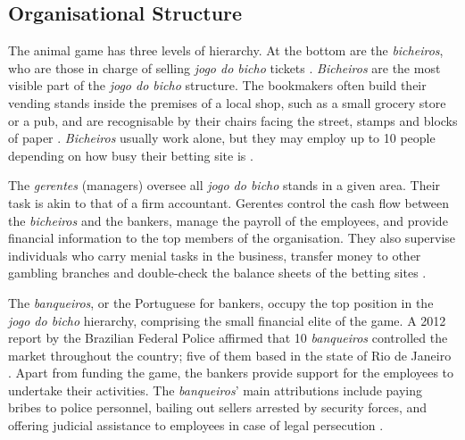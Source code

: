 \subsection{Organisational Structure}
\label{sub:organisation}

The animal game has three levels of hierarchy. At the bottom are the \emph{bicheiros}, who are those in charge of selling \emph{jogo do bicho} tickets \citep{chazkel2007beyond, chazkel2011laws, da1999aguias, labronici2014sorteio, magalhaes2005ganhou, misse2007illegal}. \emph{Bicheiros} are the most visible part of the \emph{jogo do bicho} structure. The bookmakers often build their vending stands inside the premises of a local shop, such as a small grocery store or a pub, and are recognisable by their chairs facing the street, stamps and blocks of paper \citep[259]{chazkel2011laws}. \emph{Bicheiros} usually work alone, but they may employ up to 10 people depending on how busy their betting site is \citep[69]{labronici2014sorteio}.

The \emph{gerentes} (managers) oversee all \emph{jogo do bicho} stands in a given area. Their task is akin to that of a firm accountant. Gerentes control the cash flow between the \emph{bicheiros} and the bankers, manage the payroll of the employees, and provide financial information to the top members of the organisation. They also supervise individuals who carry menial tasks in the business, transfer money to other gambling branches and double-check the balance sheets of the betting sites \citetext{\citealp[71]{labronici2012paratodos}; \citealp[142]{misse2007illegal}}.


The \emph{banqueiros}, or the Portuguese for bankers, occupy the top position in the \emph{jogo do bicho} hierarchy, comprising the small financial elite of the game. A 2012 report by the Brazilian Federal Police affirmed that 10 \emph{banqueiros} controlled the market throughout the country; five of them based in the state of Rio de Janeiro \citep{globo2012contraventores}. Apart from funding the game, the bankers provide support for the employees to undertake their activities. The \emph{banqueiros}' main attributions include paying bribes to police personnel, bailing out sellers arrested by security forces, and offering judicial assistance to employees in case of legal persecution \citep[75]{labronici2012paratodos}.

